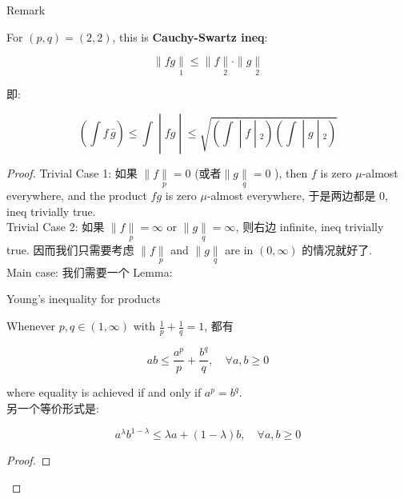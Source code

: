 \documentclass{qlnotes-export}
\begin{document}
\begin{qlremark}{Remark}

For \((p,q) = (2,2)\), this is \textbf{Cauchy-Swartz ineq}:

\[\parallel fg\underset{1}{\parallel} \leq \parallel f\underset{2}{\parallel} \cdot \parallel g\underset{2}{\parallel}\]

即:

\[\left. (\int f\,\bar{g}) \leq \int \middle| fg \middle| \leq \sqrt{\left. (\int \middle| f \middle| {}_{2})(\int \middle| g \middle| {}_{2}) \right.} \right.\]

\end{qlremark}

\begin{proof}

Trivial Case 1: 如果 \(\parallel f\underset{p}{\parallel} = 0\) (或者\(\parallel g\underset{q}{\parallel} = 0\) ), then \(f\) is zero \(\mu\)-almost everywhere, and the product \(fg\) is zero \(\mu\)-almost everywhere, 于是两边都是 \(0\), ineq trivially true.\\
Trivial Case 2: 如果 \(\parallel f\underset{p}{\parallel} = \infty\) or \(\parallel g\underset{q}{\parallel} = \infty\), 则右边 infinite, ineq trivially true. 因而我们只需要考虑 \(\parallel f\underset{p}{\parallel}\) and \(\parallel g\underset{q}{\parallel}\) are in \((0,\infty)\) 的情况就好了.\\
Main case: 我们需要一个 Lemma:

\begin{lemma}{Young's inequality for products}\label{lem-09-l-p-space-and-inequalities-young-s-inequality-for-products}

Whenever \(p,q \in (1,\infty)\) with \(\frac{1}{p} + \frac{1}{q} = 1\), 都有

\[ab \leq \frac{a^{p}}{p} + \frac{b^{q}}{q},\quad\forall a,b \geq 0\]

where equality is achieved if and only if \(a^{p} = b^{q}\).\\
另一个等价形式是:

\[a^{\lambda}b^{1 - \lambda} \leq \lambda a + (1 - \lambda)b,\quad\forall a,b \geq 0\]

\end{lemma}

\begin{proof}


\end{proof}
\end{proof}
\end{document}
